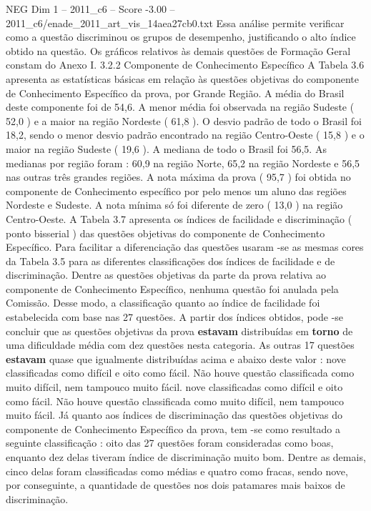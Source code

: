 \begin{textsample}{NEG Dim 1 – 2011\_c6 – Score -3.00 – 2011\_c6/enade\_2011\_art\_vis\_14aea27cb0.txt}
Essa análise permite verificar como a questão discriminou os grupos de desempenho, justificando o alto índice obtido na questão.
Os gráficos relativos às demais questões de Formação Geral constam do Anexo I. 3.2.2 Componente de Conhecimento Específico A Tabela 3.6 apresenta as estatísticas básicas em relação às questões objetivas do componente de Conhecimento Específico da prova, por Grande Região.
A média do Brasil deste componente foi de 54,6.
A menor média foi observada na região Sudeste ( 52,0 ) e a maior na região Nordeste ( 61,8 ).
O desvio padrão de todo o Brasil foi 18,2, sendo o menor desvio padrão encontrado na região Centro-Oeste ( 15,8 ) e o maior na região Sudeste ( 19,6 ).
A mediana de todo o Brasil foi 56,5.
As medianas por região foram : 60,9 na região Norte, 65,2 na região Nordeste e 56,5 nas outras três grandes regiões.
A nota máxima da prova ( 95,7 ) foi obtida no componente de Conhecimento específico por pelo menos um aluno das regiões Nordeste e Sudeste.
A nota mínima só foi diferente de zero ( 13,0 ) na região Centro-Oeste.
A Tabela 3.7 apresenta os índices de facilidade e discriminação ( ponto bisserial ) das questões objetivas do componente de Conhecimento Específico.
Para facilitar a diferenciação das questões usaram -se as mesmas cores da Tabela 3.5 para as diferentes classificações dos índices de facilidade e de discriminação.
Dentre as questões objetivas da parte da prova relativa ao componente de Conhecimento Específico, nenhuma questão foi anulada pela Comissão.
Desse modo, a classificação quanto ao índice de facilidade foi estabelecida com base nas 27 questões.
A partir dos índices obtidos, pode -se concluir que as questões objetivas da prova \textbf{estavam} distribuídas em \textbf{torno} de uma dificuldade média com dez questões nesta categoria.
As outras 17 questões \textbf{estavam} quase que igualmente distribuídas acima e abaixo deste valor : nove classificadas como difícil e oito como fácil.
Não houve questão classificada como muito difícil, nem tampouco muito fácil. nove classificadas como difícil e oito como fácil.
Não houve questão classificada como muito difícil, nem tampouco muito fácil.
Já quanto aos índices de discriminação das questões objetivas do componente de Conhecimento Específico da prova, tem -se como resultado a seguinte classificação : oito das 27 questões foram consideradas como boas, enquanto dez delas tiveram índice de discriminação muito bom.
Dentre as demais, cinco delas foram classificadas como médias e quatro como fracas, sendo nove, por conseguinte, a quantidade de questões nos dois patamares mais baixos de discriminação.

\end{textsample}
